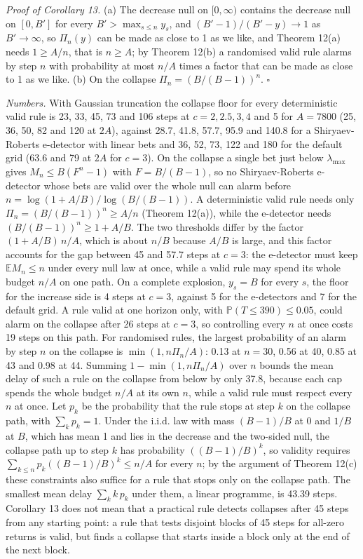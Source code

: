 \documentclass[
]{article}
\begin{document}
\emph{Proof of Corollary 13.} (a) The decrease null on \([0, \infty)\)
contains the decrease null on \([0, B']\) for every
\(B' > \max_{s \le n} y_s\), and \((B'-1)/(B'-y) \to 1\) as
\(B' \to \infty\), so \(\Pi_n(y)\) can be made as close to 1 as we like,
and Theorem 12(a) needs \(1 \ge A/n\), that is \(n \ge A\); by Theorem
12(b) a randomised valid rule alarms by step \(n\) with probability at
most \(n/A\) times a factor that can be made as close to 1 as we like.
(b) On the collapse \(\Pi_n = (B/(B-1))^n\). \(\square\)

\emph{Numbers.} With Gaussian truncation the collapse floor for every
deterministic valid rule is 23, 33, 45, 73 and 106 steps at
\(c = 2, 2.5, 3, 4\) and 5 for \(A = 7800\) (25, 36, 50, 82 and 120 at
\(2A\)), against 28.7, 41.8, 57.7, 95.9 and 140.8 for a Shiryaev-Roberts
e-detector with linear bets and 36, 52, 73, 122 and 180 for the default
grid (63.6 and 79 at \(2A\) for \(c = 3\)). On the collapse a single bet
just below \(\lambda_{\max}\) gives \(M_n \le B(F^n - 1)\) with
\(F = B/(B-1)\), so no Shiryaev-Roberts e-detector whose bets are valid
over the whole null can alarm before
\(n = \log(1 + A/B)/\log(B/(B-1))\). A deterministic valid rule needs
only \(\Pi_n = (B/(B-1))^n \ge A/n\) (Theorem 12(a)), while the
e-detector needs \((B/(B-1))^n \ge 1 + A/B\). The two thresholds differ
by the factor \((1 + A/B)\,n/A\), which is about \(n/B\) because \(A/B\)
is large, and this factor accounts for the gap between 45 and 57.7 steps
at \(c = 3\): the e-detector must keep \(\mathbb{E}M_n \le n\) under
every null law at once, while a valid rule may spend its whole budget
\(n/A\) on one path. On a complete explosion, \(y_s = B\) for every
\(s\), the floor for the increase side is 4 steps at \(c = 3\), against
5 for the e-detectors and 7 for the default grid. A rule valid at one
horizon only, with \(\mathbb{P}(T \le 390) \le 0.05\), could alarm on
the collapse after 26 steps at \(c = 3\), so controlling every \(n\) at
once costs 19 steps on this path. For randomised rules, the largest
probability of an alarm by step \(n\) on the collapse is
\(\min(1, n\Pi_n/A)\): 0.13 at \(n = 30\), 0.56 at 40, 0.85 at 43 and
0.98 at 44. Summing \(1 - \min(1, n\Pi_n/A)\) over \(n\) bounds the mean
delay of such a rule on the collapse from below by only 37.8, because
each cap spends the whole budget \(n/A\) at its own \(n\), while a valid
rule must respect every \(n\) at once. Let \(p_k\) be the probability
that the rule stops at step \(k\) on the collapse path, with
\(\sum_k p_k = 1\). Under the i.i.d. law with mass \((B-1)/B\) at 0 and
\(1/B\) at \(B\), which has mean 1 and lies in the decrease and the
two-sided null, the collapse path up to step \(k\) has probability
\(((B-1)/B)^k\), so validity requires
\(\sum_{k \le n} p_k((B-1)/B)^k \le n/A\) for every \(n\); by the
argument of Theorem 12(c) these constraints also suffice for a rule that
stops only on the collapse path. The smallest mean delay
\(\sum_k k\,p_k\) under them, a linear programme, is 43.39 steps.
Corollary 13 does not mean that a practical rule detects collapses after
45 steps from any starting point: a rule that tests disjoint blocks of
45 steps for all-zero returns is valid, but finds a collapse that starts
inside a block only at the end of the next block.
\end{document}
